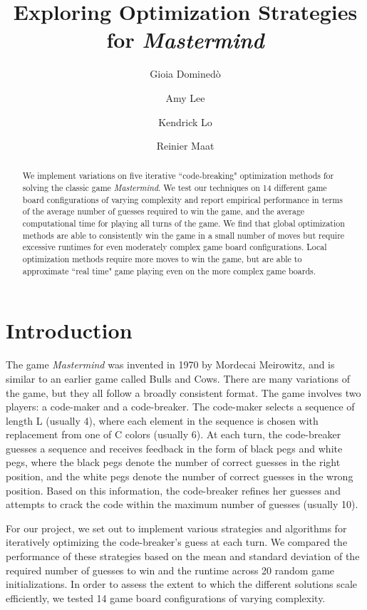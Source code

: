 \documentclass[11pt]{article}
\title{Exploring Optimization Strategies for \textit{Mastermind}}
\author{Gioia Domined\`o \and Amy Lee \and Kendrick Lo \and Reinier Maat}
\begin{document}
\maketitle{}

\begin{abstract}
\noindent We implement variations on five iterative ``code-breaking" optimization methods for solving the classic game \textit{Mastermind}. We test our techniques on 14 different game board configurations of varying complexity and report empirical performance in terms of the average number of guesses required to win the game, and the average computational time for playing all turns of the game. We find that global optimization methods are able to consistently win the game in a small number of moves but require excessive runtimes for even moderately complex game board configurations. Local optimization methods require more moves to win the game, but are able to approximate ``real time" game playing even on the more complex game boards.
\end{abstract}

\pagestyle{plain}

\section{Introduction}

The game \textit{Mastermind} was invented in 1970 by Mordecai Meirowitz, and is similar to an earlier game called Bulls and Cows. There are many variations of the game, but they all follow a broadly consistent format. The game involves two players: a code-maker and a code-breaker. The code-maker selects a sequence of length L (usually 4), where each element in the sequence is chosen with replacement from one of C colors (usually 6). At each turn, the code-breaker guesses a sequence and receives feedback in the form of black pegs and white pegs, where the black pegs denote the number of correct guesses in the right position, and the white pegs denote the number of correct guesses in the wrong position. Based on this information, the code-breaker refines her guesses and attempts to crack the code within the maximum number of guesses (usually 10).

For our project, we set out to implement various strategies and algorithms for iteratively optimizing the code-breaker's guess at each turn. We compared the performance of these strategies based on the mean and standard deviation of the required number of guesses to win and the runtime across 20 random game initializations. In order to assess the extent to which the different solutions scale efficiently, we tested 14 game board configurations of varying complexity.
\end{document}
